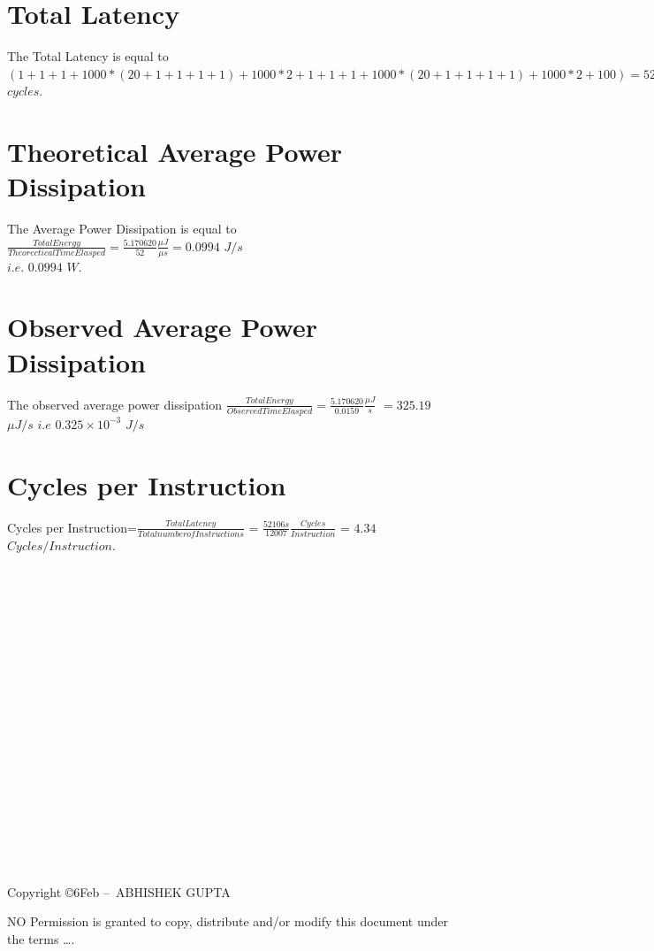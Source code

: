 \documentclass[]{article}
\begin{document}
\section{Total Latency}
The Total Latency is equal to $(1+1+1+1000*(20+1+1+1+1)+1000*2+ 1+1+1+1000*(20+1+1+1+1)+1000*2+100)=52106$ $cycles$.

\section{Theoretical Average Power Dissipation}
The Average Power Dissipation is equal to $\frac{{Total Energy}}{Theorectical Time Elasped}=\frac{5.170620}{52}\frac{\mu J}{\mu s} = 0.0994$ $ J/s $ \\$i.e.$ $ 0.0994$ $W $.
\section{Observed Average Power Dissipation}
The observed average power dissipation  $\frac{{Total Energy}}{Observed Time Elasped}=\frac{5.170620}{0.0159}\frac{\mu J}{s} $ $=325.19$ $\mu J/s$ $i.e $ $0.325\times 10^{-3}$ $J/s$
\section{Cycles per Instruction}
Cycles per Instruction=$\frac{Total Latency}{Total number of Instructions}$ = $\frac{52106s}{12007}\frac{Cycles}{Instruction}$ = $4.34$ $Cycles/Instruction$.
\\ \\ \\ \\ \\ \\ \\ \\ \\ \\ \\ \\ \\ \\ \\ \\ \\ \\ \\ \\
Copyright \copyright 6Feb --\the\year\ ABHISHEK GUPTA\par
NO Permission is granted to copy, distribute and\slash or modify 
this document under the terms \ldots. 
\end{document}
